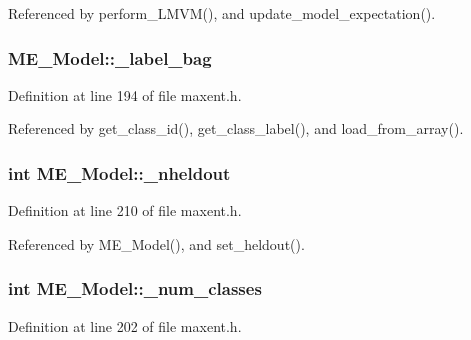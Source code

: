Referenced by perform\_\-LMVM(), and update\_\-model\_\-expectation().\hypertarget{classME__Model_4182ebe09a43ab1e94d6b438d79c3075}{
\subsubsection[{\_\-label\_\-bag}]{ {\bf ME\_\-Model::\_\-label\_\-bag}}}
\label{classME__Model_4182ebe09a43ab1e94d6b438d79c3075}




Definition at line 194 of file maxent.h.

Referenced by get\_\-class\_\-id(), get\_\-class\_\-label(), and load\_\-from\_\-array().\hypertarget{classME__Model_ba7ea42febb256bf94f54245255a34a5}{
\subsubsection[{\_\-nheldout}]{\setlength{\rightskip}{0pt plus 5cm}int {\bf ME\_\-Model::\_\-nheldout}}}
\label{classME__Model_ba7ea42febb256bf94f54245255a34a5}




Definition at line 210 of file maxent.h.

Referenced by ME\_\-Model(), and set\_\-heldout().\hypertarget{classME__Model_7a85f402ac9fea030c49f7c6216df686}{
\subsubsection[{\_\-num\_\-classes}]{\setlength{\rightskip}{0pt plus 5cm}int {\bf ME\_\-Model::\_\-num\_\-classes}}}
\label{classME__Model_7a85f402ac9fea030c49f7c6216df686}




Definition at line 202 of file maxent.h.

